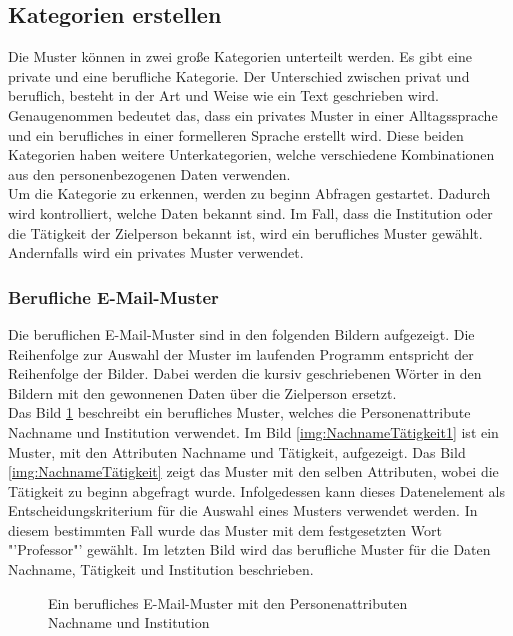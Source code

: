 	\subsection{Kategorien erstellen}
	Die Muster können in zwei große Kategorien unterteilt werden. Es gibt eine private und eine berufliche Kategorie. Der Unterschied zwischen privat und beruflich, besteht in der Art und Weise wie ein Text geschrieben wird. Genaugenommen bedeutet das, dass ein privates Muster in einer Alltagssprache und ein berufliches in einer formelleren Sprache erstellt wird. Diese beiden Kategorien haben weitere Unterkategorien, welche verschiedene Kombinationen aus den personenbezogenen Daten verwenden.\\
	Um die Kategorie zu erkennen, werden zu beginn Abfragen gestartet. Dadurch wird kontrolliert, welche Daten bekannt sind. Im Fall, dass die Institution oder die Tätigkeit der Zielperson bekannt ist, wird ein berufliches Muster gewählt. Andernfalls wird ein privates Muster verwendet.
	
		\subsubsection{Berufliche E-Mail-Muster}
		\label{subsubsec:beruflicheMuster}
		Die beruflichen E-Mail-Muster sind in den folgenden Bildern aufgezeigt. Die Reihenfolge zur Auswahl der Muster im laufenden Programm entspricht der Reihenfolge der Bilder. Dabei werden die kursiv geschriebenen Wörter in den Bildern mit den gewonnenen Daten über die Zielperson ersetzt.\\ 
		Das Bild \ref{img:NameInstitution} beschreibt ein berufliches Muster, welches die Personenattribute Nachname und Institution verwendet. Im Bild \ref{img:NachnameTätigkeit1} ist ein Muster, mit den Attributen Nachname und Tätigkeit, aufgezeigt. Das Bild \ref{img:NachnameTätigkeit} zeigt das Muster mit den selben Attributen, wobei die Tätigkeit zu beginn abgefragt wurde. Infolgedessen kann dieses Datenelement als Entscheidungskriterium für die Auswahl eines Musters verwendet werden. In diesem bestimmten Fall wurde das Muster mit dem festgesetzten Wort "'Professor"' gewählt. Im letzten Bild wird das berufliche Muster für die Daten Nachname, Tätigkeit und Institution beschrieben.
			\begin{figure}[h!]
				\label{img:NameInstitution}
				\caption{Ein berufliches E-Mail-Muster mit den Personenattributen Nachname und Institution }
			\end{figure}
		
